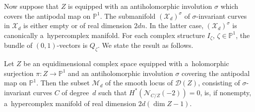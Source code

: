 Now suppose that $Z$ is equipped with an antiholomorphic involution $\sigma$ which covers the antipodal map on
${\mathbb{P}}^1$.
The submanifold $({\mathcal{X}}_d)^\sigma$ of $\sigma$-invariant curves in ${\mathcal{X}}_d$ is either empty or of real
dimension $2dn$.
In the latter case, $({\mathcal{X}}_d)^\sigma$ is canonically a~hypercomplex manifold.
For each complex structure $I_\zeta$, $\zeta\in {\mathbb{P}}^1$, the bundle of $(0,1)$-vectors is $Q_\zeta$.
We state the result as follows.
\begin{Theorem}\label{hc}
Let $Z$ be an equidimensional complex space equipped with a~holomorphic surjection $\pi:Z\to {\mathbb{P}}^1$ and an
antiholomorphic involution $\sigma$ covering the antipodal map on ${\mathbb{P}}^1$.
Then the subset ${\mathcal{M}}_d$ of the smooth locus of ${\mathcal{D}}(Z)$, consisting of $\sigma$-invariant curves $C$
of degree~$d$ such that $H^\ast({\mathcal{N}}_{C/Z}(-2))=0$, is, if nonempty, a~hypercomplex manifold of real dimension
$2d(\dim Z -1)$.
\end{Theorem}
